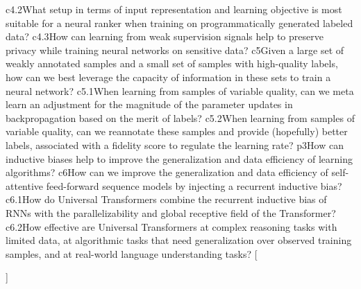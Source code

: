{{    %
    {c4.2}{What setup in terms of input representation and learning objective is most suitable for a neural ranker when training on programmatically generated labeled data?}
    {c4.3}{How can learning from weak supervision signals help to preserve privacy while training neural networks on sensitive data?}
    {c5}{Given a large set of weakly annotated samples and a small set of samples with high-quality labels, how can we best leverage the capacity of information in these sets to train a neural network?}%
    {c5.1}{When learning from samples of variable quality, can we meta learn an adjustment for the magnitude of the parameter updates in backpropagation based on the merit of labels?}
    {c5.2}{When learning from samples of variable quality, can we reannotate these samples and provide (hopefully) better labels, associated with a fidelity score to regulate the learning rate?}
    {p3}{How can inductive biases help to improve the generalization and data efficiency of learning algorithms?}
    {c6}{How can we improve the generalization and data efficiency of self-attentive feed-forward sequence models by injecting a recurrent inductive bias?}
    {c6.1}{How do Universal Transformers combine the recurrent inductive bias of RNNs with the parallelizability and global receptive field of the Transformer?}
    {c6.2}{How effective are Universal Transformers at complex reasoning tasks with limited data, at algorithmic tasks that need generalization over observed training samples, and at real-world language understanding tasks?}
    }[\PackageError{rq}{Undefined option to rq: #1}{}]%
}%

\newcommand{\resqname}[1]{%
    \IfEqCase{#1}{%
    {main}{RQ-Main}
    {p1}{RQ-1}
    {c2}{RQ-1.1}
    {c2.1}{RQ-1.1.1}
    {c2.2}{RQ-1.1.2}
    {c2.3}{RQ-1.1.3}
    {c3}{RQ-1.2}
    {c3.1}{RQ-1.2.1}
    {c3.2}{RQ-1.2.2}
    {c3.3}{RQ-1.2.3}
    {p2}{RQ-2}
    {c4}{RQ-2.1}%
    {c4.1}{RQ-2.1.1}
    {c4.2}{RQ-2.1.2}
    {c4.3}{RQ-2.1.3}
    {c5}{RQ-2.2}%
    {c5.1}{RQ-2.2.1}
    {c5.2}{RQ-2.2.2}
    {p3}{RQ-3}
    {c6}{RQ-3.1}%
    {c6.1}{RQ-3.1.1}
    {c6.2}{RQ-3.1.2}
    }[\PackageError{rq}{Undefined option to rq: #1}{}]%
}%

\newcommand{\resq}[1]{%
    \begin{resqbox}
        \begin{enumerate}
            \item[\textbf{\resqname{#1}}] \emph{\resqcontent{#1}}
        \end{enumerate}
    \end{resqbox}
}%